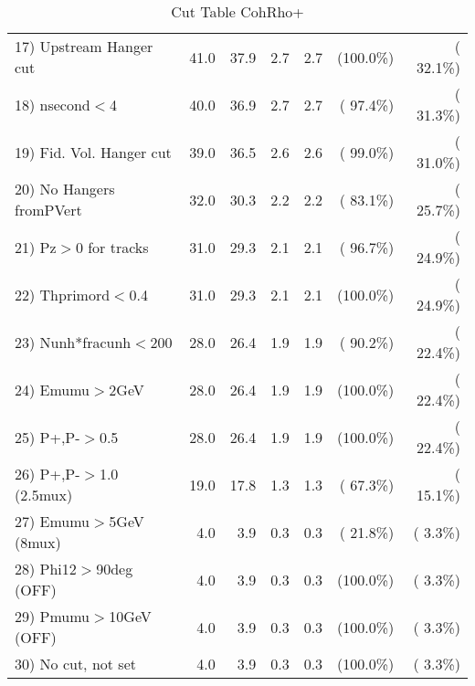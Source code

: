 \begin{table}[h!]
\begin{tabular}{||l||r|r|r|r|r|r||}
 17) Upstream Hanger cut  &         41.0 &         37.9 &          2.7 &          2.7 & (100.0\%) & ( 32.1\%) \\
 18) nsecond$<$4          &         40.0 &         36.9 &          2.7 &          2.7 & ( 97.4\%) & ( 31.3\%) \\
 19) Fid. Vol. Hanger cut &         39.0 &         36.5 &          2.6 &          2.6 & ( 99.0\%) & ( 31.0\%) \\
 20) No Hangers fromPVert &         32.0 &         30.3 &          2.2 &          2.2 & ( 83.1\%) & ( 25.7\%) \\
 21) Pz$>$0 for tracks    &         31.0 &         29.3 &          2.1 &          2.1 & ( 96.7\%) & ( 24.9\%) \\
 22) Thprimord$<$0.4      &         31.0 &         29.3 &          2.1 &          2.1 & (100.0\%) & ( 24.9\%) \\
 23) Nunh*fracunh$<$200   &         28.0 &         26.4 &          1.9 &          1.9 & ( 90.2\%) & ( 22.4\%) \\
 24) Emumu$>$2GeV         &         28.0 &         26.4 &          1.9 &          1.9 & (100.0\%) & ( 22.4\%) \\
 25) P+,P-$>$0.5          &         28.0 &         26.4 &          1.9 &          1.9 & (100.0\%) & ( 22.4\%) \\
 26) P+,P-$>$1.0 (2.5mux) &         19.0 &         17.8 &          1.3 &          1.3 & ( 67.3\%) & ( 15.1\%) \\
 27) Emumu$>$5GeV  (8mux) &          4.0 &          3.9 &          0.3 &          0.3 & ( 21.8\%) & (  3.3\%) \\
 28) Phi12$>$90deg  (OFF) &          4.0 &          3.9 &          0.3 &          0.3 & (100.0\%) & (  3.3\%) \\
 29) Pmumu$>$10GeV  (OFF) &          4.0 &          3.9 &          0.3 &          0.3 & (100.0\%) & (  3.3\%) \\
 30) No cut, not set      &          4.0 &          3.9 &          0.3 &          0.3 & (100.0\%) & (  3.3\%) \\
 \hline
 \hline
 \end{tabular}
 \caption{Cut Table  CohRho+  }
 \label{tab-cutcohjpsi-mumu_anumunc}
 \end{table}

